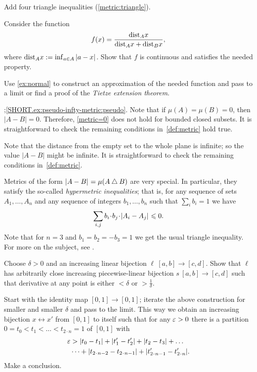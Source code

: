 \setcounter{eqtn}{0}

Add four triangle inequalities (\ref{metric:triangle}).

Consider the function 
\[f(x)=\frac{\mathrm{dist}_Ax}{\mathrm{dist}_Ax+\mathrm{dist}_Bx},\]
where $\distfun_Ax\z\df\inf_{a\in A}\dist{a}{x}{}$.
Show that $f$ is continuous and satisfies the needed property.

Use \ref{ex:normal} to construct an approximation of the needed function and pass to a limit or find a proof of the \emph{Tietze extension theorem}.

\parbf{\ref{ex:pseudo-infty-metric}};\ref{SHORT.ex:pseudo-infty-metric:pseudo}.
Note that if $\mu(A)=\mu(B)=0$, then $|A-B|=0$.
Therefore, \ref{metric=0} does not hold for bounded closed subsets.
It is straightforward to check the remaining conditions in~\ref{def:metric} hold true.

Note that the distance from the empty set to the whole plane is infinite; so the value $|A-B|$ might be infinite.
It is straightforward to check the remaining conditions in~\ref{def:metric}.

Metrics of the form $\dist{A}{B}{}=\mu(A\bigtriangleup B)$ are very special.
In particular, they satisfy the so-called \emph{hypermetric inequalities}; that is, for any sequence of sets $A_1,\dots, A_n$ and any sequence of integers $b_1,\dots,b_n$ such that $\sum_ib_i=1$ we have
\[\sum_{i,j}b_i\cdot b_j\cdot \dist{A_i}{A_j}{}\le 0.\]
Note that for $n=3$ and $b_1=b_2=-b_3=1$ we get the usual triangle inequality.
For more on the subject, see \cite{deza-laurent}.

Choose $\delta>0$ and an increasing linear bijection $\ell\:[a,b]\to [c,d]$.
Show that $\ell$ has arbitrarily close increasing piecewise-linear bijection $s\:[a,b]\to [c,d]$ such that derivative at any point is either $<\delta$ or $>\tfrac1\delta$.

Start with the identity map $[0,1]\to [0,1]$;
iterate the above construction for smaller and smaller $\delta$ and pass to the limit.
This way we obtain an increasing  bijection $x\leftrightarrow x'$ from $[0,1]$ to itself
such that for any $\varepsilon>0$ there is a partition $0=t_0<t_1<\dots <t_{2\cdot n}=1$ of $[0,1]$ with 
\begin{align*}
\eps&>|t_0-t_1|+|t_1'-t_2'|+|t_2-t_3|+\dots
\\
&\dots+|t_{2\cdot n-2}-t_{2\cdot n-1}|+|t_{2\cdot n-1}'-t_{2\cdot n}'|.
\end{align*}
Make a conclusion.

